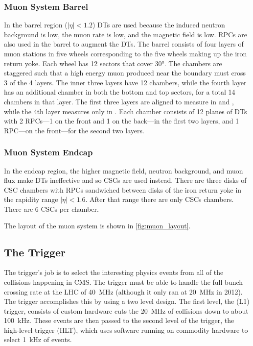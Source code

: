 \subsubsection{Muon System Barrel}

In the barrel region ($|\eta| < 1.2$) DTs are used because the induced neutron
background is low, the muon rate is low, and the magnetic field is low. RPCs
are also used in the barrel to augment the DTs. The barrel consists of four
layers of muon stations in five wheels corresponding to the five wheels making
up the iron return yoke. Each wheel has \num{12} sectors that cover \ang{30}.
The chambers are staggered such that a high energy muon produced near the
boundary must cross \num{3} of the \num{4} layers. The inner three layers have
\num{12} chambers, while the fourth layer has an additional chamber in both the
bottom and top sectors, for a total \num{14} chambers in that layer. The first
three layers are aligned to measure in \coordrphi and \coordz, while the 4th
layer measures only in \coordrphi. Each chamber consists of \num{12} planes of
DTs with \num{2} RPCs---\num{1} on the front and \num{1} on the back---in the
first two layers, and \num{1} RPC---on the front---for the second two layers.

\subsubsection{Muon System Endcap}

In the endcap region, the higher magnetic field, neutron background, and muon
flux make DTs ineffective and so CSCs are used instead. There are three disks
of CSC chambers with RPCs sandwiched between disks of the iron return yoke in
the rapidity range $|\eta| < 1.6$. After that range there are only CSCs
chambers. There are \num{6} CSCs per chamber.

The layout of the muon system is shown in \cref{fig:muon_layout}.

\subsection{The Trigger}
\label{ssec:trigger}

The trigger's job is to select the interesting physics events from all of the
collisions happening in CMS. The trigger must be able to handle the full bunch
crossing rate at the LHC of \SI{40}{\mega\hertz} (although it only ran at
\SI{20}{\mega\hertz} in 2012). The trigger accomplishes this by using a two
level design. The first level, the \Lone (L1) trigger, consists of custom
hardware cuts the \SI{20}{\mega\hertz} of collisions down to about
\SI{100}{\kilo\hertz}. These events are then passed to the second level of the
trigger, the high-level trigger (HLT), which uses software running on commodity
hardware to select \SI{1}{\kilo\hertz} of events.

